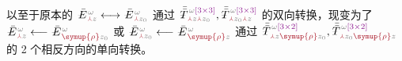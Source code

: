 以至于原本的 $\xint{\mathcolor{gray}{-}}{25}{\bar{E}}^{\;\!\mathcolor{gray}{\omega}}_{\;\! \textcolor{Maroon}{\Yup} \mathcolor{gray}{z}} \longleftrightarrow \xint{\mathcolor{gray}{-}}{25}{\bar{E}}^{\;\!\mathcolor{gray}{\omega}}_{\;\! \textcolor{Maroon}{\Yup} \mathcolor{gray}{z_0}}$ 通过 $\xint{\mathcolor{gray}{-}}{30}{\bar{\bar{T}}}^{\;\!\mathcolor{gray}{\omega} \textcolor{Plum}{\left[3 \times 3\right]}}_{\;\! \textcolor{Maroon}{\Yup} \mathcolor{gray}{z} \textcolor{Maroon}{\Yup} \mathcolor{gray}{z_0}}, \xint{\mathcolor{gray}{-}}{30}{\bar{\bar{T}}}^{\;\!\mathcolor{gray}{\omega} \textcolor{Plum}{\left[3 \times 3\right]}}_{\;\! \textcolor{Maroon}{\Yup} \mathcolor{gray}{z_0} \textcolor{Maroon}{\Yup} \mathcolor{gray}{z}}$ 的双向转换，现变为了 $\xint{\mathcolor{gray}{-}}{25}{\bar{E}}^{\;\!\mathcolor{gray}{\omega}}_{\;\! \textcolor{Maroon}{\Yup} \mathcolor{gray}{z}} \longleftarrow \xint{\mathcolor{gray}{-}}{25}{\bar{E}}^{\;\!\mathcolor{gray}{\omega}}_{\;\! \textcolor{Maroon}{\symup{\rho}} \mathcolor{gray}{z_0}}$ 或 $\xint{\mathcolor{gray}{-}}{25}{\bar{E}}^{\;\!\mathcolor{gray}{\omega}}_{\;\! \textcolor{Maroon}{\Yup} \mathcolor{gray}{z_0}} \longleftarrow \xint{\mathcolor{gray}{-}}{25}{\bar{E}}^{\;\!\mathcolor{gray}{\omega}}_{\;\! \textcolor{Maroon}{\symup{\rho}} \mathcolor{gray}{z}}$ 通过 $\xint{\mathcolor{gray}{-}}{30}{\bar{\bar{T}}}^{\;\!\mathcolor{gray}{\omega} \textcolor{Plum}{\left[3 \times 2\right]}}_{\;\! \textcolor{Maroon}{\Yup} \mathcolor{gray}{z} \textcolor{Maroon}{\symup{\rho}} \mathcolor{gray}{z_0}}, \xint{\mathcolor{gray}{-}}{30}{\bar{\bar{T}}}^{\;\!\mathcolor{gray}{\omega} \textcolor{Plum}{\left[3 \times 2\right]}}_{\;\! \textcolor{Maroon}{\Yup} \mathcolor{gray}{z_0} \textcolor{Maroon}{\symup{\rho}} \mathcolor{gray}{z}}$ 的 2 个相反方向的单向转换。

